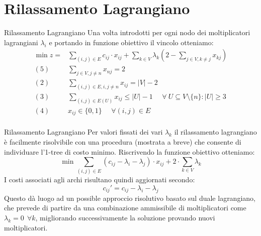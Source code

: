 \documentclass[10pt]{beamer}
\begin{document}
\section{Rilassamento Lagrangiano}
\begin{frame}{Rilassamento Lagrangiano}
    Una volta introdotti per ogni nodo dei moltiplicatori lagrangiani $\lambda_i$ e portando in funzione obiettivo il vincolo otteniamo:
    \begin{equation*}
        \begin{split}
             \min z = & \sum_{(i,j) \in E} c_{ij} \cdot x_{ij} + \sum_{k\in V} \lambda_k (2 - \sum_{j\in V, k\neq j} x_{kj})\\
            (5)\:\:\:\:\:\: & \sum_{j \in V, j \neq n} x_{nj} = 2 \\
            (2) \:\:\:\:\:\: & \sum_{(i,j)\in E, i, j \neq n} x_{ij} = |V|-2 \\
            (3) \:\:\:\:\:\: & \sum_{(i,j) \in E(U)} x_{ij} \leq |U| - 1 \:\:\:\:\:\: \forall\: U \subseteq V\setminus\{n\} : |U| \geq 3 \\
            (4) \:\:\:\:\:\: & x_{ij} \in \{0,1\} \:\:\:\:\:\: \forall (i,j) \in E\\
        \end{split}
    \end{equation*}
\end{frame}

\begin{frame}{Rilassamento Lagrangiano}
     Per valori fissati dei vari $\lambda_k$ il rilassamento lagrangiano è facilmente risolvibile con una procedura (mostrata a breve) che consente di individuare l'1-tree di costo minimo.
    \newline
    \newline
    Riscrivendo la funzione obiettivo otteniamo:
    \begin{equation*}
         \min \sum_{(i,j)\in E} ( c_{ij} - \lambda_i - \lambda_j) \cdot x_{ij} + 2 \cdot \sum_{k \in V} \lambda_k
    \end{equation*}
    I costi associati agli archi risultano quindi aggiornati secondo:
    \begin{equation*}
        c_{ij}' = c_{ij} - \lambda_i - \lambda_j
    \end{equation*}
    Questo dà luogo ad un possible approccio risolutivo basato sul duale lagrangiano, che prevede di partire da una combinazione ammissibile di moltiplicatori come $\lambda_k = 0\:\: \forall k$, migliorando successivamente la soluzione provando nuovi moltiplicatori.
\end{frame}
\end{document}

